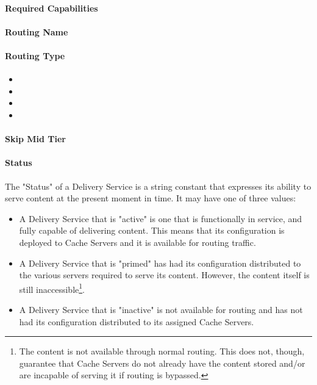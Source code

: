 
\paragraph{Required Capabilities}

\paragraph{Routing Name}

\paragraph{Routing Type}
\begin{itemize}
	\item {}
	\item {}
	\item {}
	\item {}
\end{itemize}

\paragraph{Skip Mid Tier}

\paragraph{Status}
The "Status" of a Delivery Service is a string constant that expresses its ability
to serve content at the present moment in time. It may have one of three values:

\begin{itemize}
	\item {} A Delivery Service that is "active" is one that is
	functionally in service, and fully capable of delivering content. This means
	that its configuration is deployed to Cache Servers and it is available for
	routing traffic.
	\item {} A Delivery Service that is "primed" has had its
	configuration distributed to the various servers required to serve its content.
	However, the content itself is still inaccessible\footnote{The content is not
	available through normal routing. This does not, though, guarantee that Cache
	Servers do not already have the content stored and/or are incapable of serving
	it if routing is bypassed.}.
	\item {} A Delivery Service that is "inactive" is not available for
	routing and has not had its configuration distributed to its assigned Cache
	Servers.
\end{itemize}

